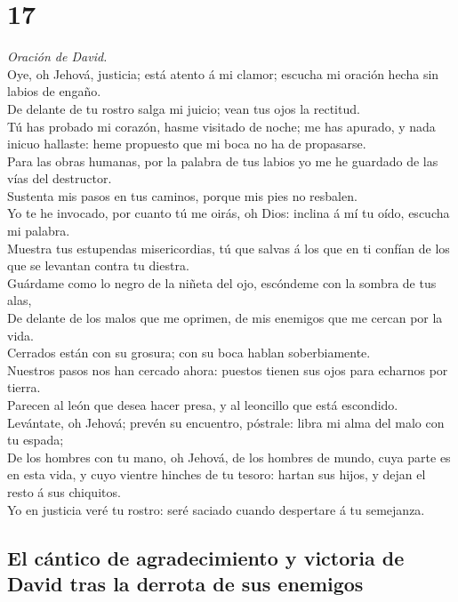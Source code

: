 \hypertarget{section-16}{%
\section{17}\label{section-16}}

 \emph{Oración de David.}\\
Oye, oh Jehová, justicia; está atento á mi clamor; escucha mi oración
hecha sin labios de engaño.\\
 De delante de tu rostro salga mi juicio; vean tus ojos la
rectitud.\\
 Tú has probado mi corazón, hasme visitado de noche; me has
apurado, y nada inicuo hallaste: heme propuesto que mi boca no ha de
propasarse.\\
 Para las obras humanas, por la palabra de tus labios yo me
he guardado de las vías del destructor.\\
 Sustenta mis pasos en tus caminos, porque mis pies no
resbalen.\\
 Yo te he invocado, por cuanto tú me oirás, oh Dios: inclina
á mí tu oído, escucha mi palabra.\\
 Muestra tus estupendas misericordias, tú que salvas á los
que en ti confían de los que se levantan contra tu diestra.\\
 Guárdame como lo negro de la niñeta del ojo, escóndeme con
la sombra de tus alas,\\
 De delante de los malos que me oprimen, de mis enemigos que
me cercan por la vida.\\
 Cerrados están con su grosura; con su boca hablan
soberbiamente.\\
 Nuestros pasos nos han cercado ahora: puestos tienen sus
ojos para echarnos por tierra.\\
 Parecen al león que desea hacer presa, y al leoncillo que
está escondido.\\
 Levántate, oh Jehová; prevén su encuentro, póstrale: libra
mi alma del malo con tu espada;\\
 De los hombres con tu mano, oh Jehová, de los hombres de
mundo, cuya parte es en esta vida, y cuyo vientre hinches de tu tesoro:
hartan sus hijos, y dejan el resto á sus chiquitos.\\
 Yo en justicia veré tu rostro: seré saciado cuando
despertare á tu semejanza.

\hypertarget{el-cuxe1ntico-de-agradecimiento-y-victoria-de-david-tras-la-derrota-de-sus-enemigos}{%
\subsection{El cántico de agradecimiento y victoria de David tras la
derrota de sus
enemigos}\label{el-cuxe1ntico-de-agradecimiento-y-victoria-de-david-tras-la-derrota-de-sus-enemigos}}

